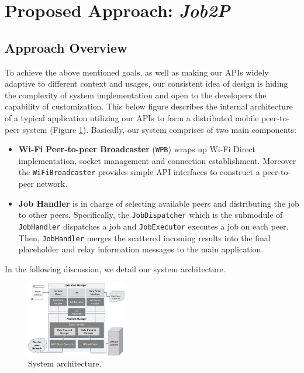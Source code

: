 \documentclass[conference]{IEEEtran}
\begin{document}
\section{Proposed Approach: \emph{Job2P}}
\label{sec:approach}

\subsection{Approach Overview}
To achieve the above mentioned goals, as well as making our APIs widely adaptive to different context and usages, our consistent idea of design is hiding the complexity of system implementation and open to the developers the capability of customization. This below figure describes the internal architecture of a typical application utilizing our APIs to form a distributed mobile peer-to-peer system (Figure \ref{fig:architecture}). Basically, our system comprises of two main components:

\begin{itemize}
	\item \textbf{Wi-Fi Peer-to-peer Broadcaster} (\texttt{WPB}) wraps up Wi-Fi Direct implementation, socket management and connection establishment. Moreover the \texttt{WiFiBroadcaster} provides simple API interfaces to construct a peer-to-peer network.
	\item \textbf{Job Handler} is in charge of selecting available peers and distributing the job to other peers. Specifically, the \texttt{JobDispatcher} which is the submodule of \texttt{JobHandler} dispatches a job and \texttt{JobExecutor} executes a job on each peer. Then, \texttt{JobHandler} merges the scattered incoming results into the final placeholder and relay information messages to the main application.
\end{itemize}

In the following discussion, we detail our system architecture.

\begin{figure}
\centerline {
\includegraphics[width=0.39\textwidth, natwidth=643, natheight=559]{data/jobShareArch}
}
\caption{System architecture.}
\label{fig:architecture}
\end{figure}
\end{document}

